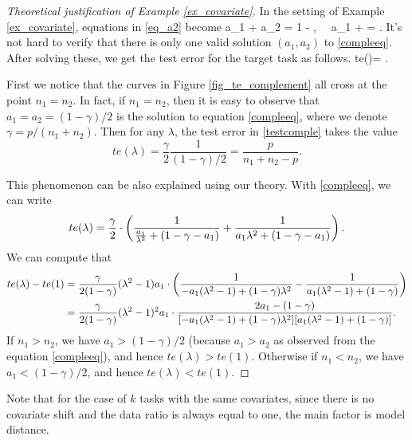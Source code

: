 \begin{proof}[Theoretical justification of Example \ref{ex_covariate}]
In the setting of Example \ref{ex_covariate}, equations in \eqref{eq_a2} become
\be\label{compleeq} a_1 + a_2 = 1 - ,  \ \ a_1 + \cdot {} = . \ee
It's not hard to verify that there is only one valid solution $(a_1,a_2)$ to \eqref{compleeq}. After solving these, we get the test error for the target task as follows.
\be\label{testcomple}
te(\lambda)= \cdot {}.\ee

First we notice that the curves in Figure \ref{fig_te_complement} all cross at the point $n_1=n_2$. In fact, if $n_1=n_2$, then it is easy to observe that $a_1=a_2=(1-\gamma)/2$ is the solution to equation \eqref{compleeq}, where we denote $ \gamma=p/(n_1+n_2)$. Then for any $\lambda$, the test error in \eqref{testcomple} takes the value
$$te(\lambda)= \frac{\gamma}{2}\frac{1}{(1-\gamma)/2}=\frac{p}{n_1+n_2-p}.$$

This phenomenon can be also explained using our theory. With \eqref{compleeq}, we can write
$$te(\lambda)=\frac{\gamma}{2} \cdot \left({\frac{1}{\frac{a_1}{\lambda^2} + (1-\gamma - a_1)} + \frac{1}{a_1\lambda^2 + (1-\gamma - a_1)}}\right).$$
We can compute that
\begin{align*}
te(\lambda) - te(1)&= \frac{\gamma}{2(1-\gamma)} (\lambda^2-1)a_1\cdot \left({  \frac{1}{ -a_1(\lambda^2-1)+(1-\gamma)\lambda^2 } - \frac{1}{a_1(\lambda^2-1) + (1-\gamma)}}\right) \\
&= \frac{\gamma}{2(1-\gamma)} (\lambda^2-1)^2 a_1\cdot  \frac{2a_1 - (1-\gamma) }{[-a_1(\lambda^2-1)+(1-\gamma)\lambda^2 ][a_1(\lambda^2-1) + (1-\gamma)]} .
\end{align*}
If $n_1>n_2$, we have $a_1>(1-\gamma)/2$ (because $a_1>a_2$ as observed from the equation \eqref{compleeq}), and hence $te(\lambda)>te(1)$. Otherwise if $n_1< n_2$, we have $a_1< (1-\gamma)/2$, and hence $te(\lambda)< te(1)$.
\end{proof}


\iffalse
Note that for the case of $k$ tasks with the same covariates, since there is no covariate shift and the data ratio is always equal to one, the main factor is model distance.

